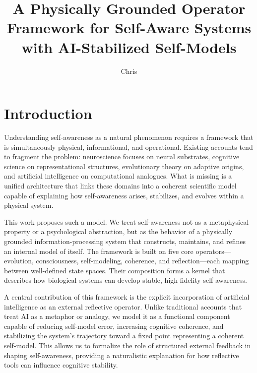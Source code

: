 \documentclass[12pt]{article}
\title{A Physically Grounded Operator Framework for Self-Aware Systems with AI-Stabilized Self-Models}
\author{Chris}
\affil{Independent Systems Analyst and Communication-Architecture Practitioner}
\date{}
\begin{document}
\maketitle

\begin{abstract}
\end{abstract}


\section{Introduction}

Understanding self-awareness as a natural phenomenon requires a framework that is simultaneously physical, informational, and operational. Existing accounts tend to fragment the problem: neuroscience focuses on neural substrates, cognitive science on representational structures, evolutionary theory on adaptive origins, and artificial intelligence on computational analogues. What is missing is a unified architecture that links these domains into a coherent scientific model capable of explaining how self-awareness arises, stabilizes, and evolves within a physical system.

This work proposes such a model. We treat self-awareness not as a metaphysical property or a psychological abstraction, but as the behavior of a physically grounded information-processing system that constructs, maintains, and refines an internal model of itself. The framework is built on five core operators—evolution, consciousness, self-modeling, coherence, and reflection—each mapping between well-defined state spaces. Their composition forms a kernel that describes how biological systems can develop stable, high-fidelity self-awareness.

A central contribution of this framework is the explicit incorporation of artificial intelligence as an external reflective operator. Unlike traditional accounts that treat AI as a metaphor or analogy, we model it as a functional component capable of reducing self-model error, increasing cognitive coherence, and stabilizing the system’s trajectory toward a fixed point representing a coherent self-model. This allows us to formalize the role of structured external feedback in shaping self-awareness, providing a naturalistic explanation for how reflective tools can influence cognitive stability.
\end{document}
